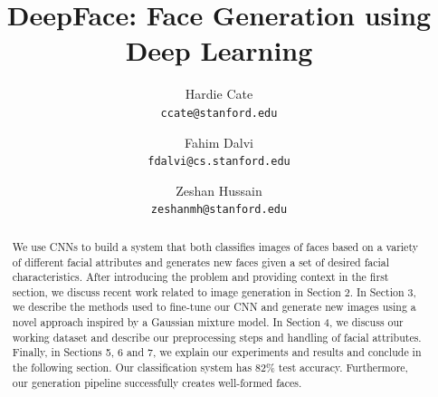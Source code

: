 \documentclass[10pt,twocolumn,letterpaper]{article}
\begin{document}
\title{DeepFace: Face Generation using Deep Learning}
\author{Hardie Cate\\
{\tt\small ccate@stanford.edu}
\and
Fahim Dalvi\\
{\tt\small fdalvi@cs.stanford.edu}
\and
Zeshan Hussain\\
{\tt\small zeshanmh@stanford.edu}
}

\maketitle

\begin{abstract}
We use CNNs to build a system that both classifies images of faces based on a variety of different facial attributes and generates new faces given a set of desired facial characteristics. 
After introducing the problem and providing context in the first section, we discuss recent work related to image generation in Section 2.
In Section 3, we describe the methods used to fine-tune our CNN and generate new images using a novel approach inspired by a Gaussian mixture model.
In Section 4, we discuss our working dataset and describe our preprocessing steps and handling of facial attributes.
Finally, in Sections 5, 6 and 7, we explain our experiments and results and conclude in the following section.
Our classification system has 82\% test accuracy.
Furthermore, our generation pipeline successfully creates well-formed faces.
\end{abstract}

\end{document}
